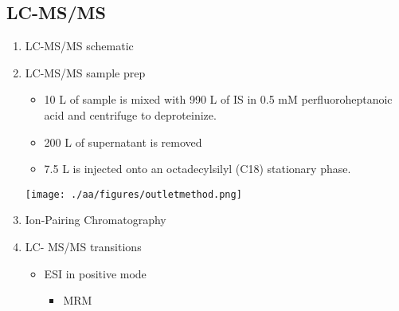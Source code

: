 \documentclass{scrartcl}
\begin{document}
\subsection{LC-MS/MS}
\label{sec:orgd677e0b}
\begin{enumerate}
\item LC-MS/MS schematic
\label{sec:org7eab10d}
\begin{center}
\end{center}


\item LC-MS/MS sample prep
\label{sec:org2db72e7}
\begin{itemize}
\item 10 \textmu{}L of sample is mixed with 990 \textmu{}L of IS in 0.5 mM perfluoroheptanoic acid and centrifuge to deproteinize.
\item 200 \textmu{}L of supernatant is removed
\item 7.5 \textmu{}L is injected onto an octadecylsilyl (C18) stationary phase.
\end{itemize}


\begin{center}
\texttt{[image: ./aa/figures/outletmethod.png]}
\end{center}

\item Ion-Pairing Chromatography
\label{sec:org1915c30}
\vspace{3em}

\item LC- MS/MS transitions
\label{sec:orgefa34d3}
\begin{itemize}
\item ESI in positive mode
\begin{itemize}
\item MRM
\end{itemize}
\end{itemize}


\end{enumerate}
\end{document}
